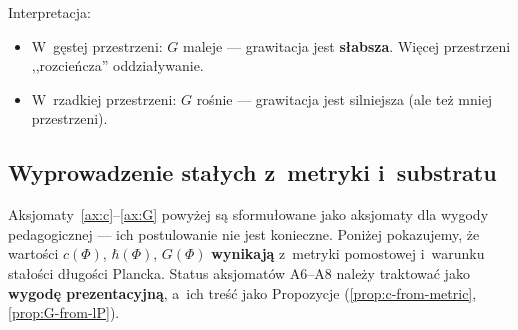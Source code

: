 Interpretacja:
\begin{itemize}[nosep]
  \item W~g\k{e}stej przestrzeni: $G$ maleje --- grawitacja jest
        \textbf{s\l{}absza}. Wi\k{e}cej przestrzeni ,,rozcieńcza''
        oddzia\l{}ywanie.
  \item W~rzadkiej przestrzeni: $G$ ro\'snie --- grawitacja jest
        silniejsza (ale te\.z mniej przestrzeni).
\end{itemize}

\subsection{Wyprowadzenie sta\l{}ych z~metryki i~substratu}\label{ssec:stalych-deriv}

Aksjomaty~\ref{ax:c}--\ref{ax:G} powy\.zej s\k{a} sformu\l{}owane
jako aksjomaty dla wygody pedagogicznej --- ich postulowanie nie jest
konieczne. Poni\.zej pokazujemy, \.ze warto\'sci $c(\Phi)$, $\hbar(\Phi)$,
$G(\Phi)$ \textbf{wynikaj\k{a}} z~metryki pomostowej i~warunku
sta\l{}o\'sci d\l{}ugo\'sci Plancka. Status aksjomat\'ow A6--A8
nale\.zy traktowa\'c jako \textbf{wygod\k{e} prezentacyjn\k{a}},
a~ich tre\'s\'c jako Propozycje (\ref{prop:c-from-metric},
\ref{prop:G-from-lP}).

